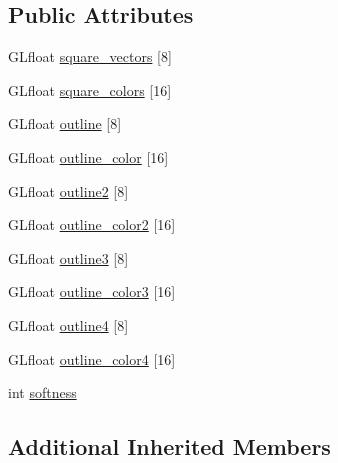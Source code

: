 \subsection*{Public Attributes}
\begin{DoxyCompactItemize}
\item 
G\-Lfloat \hyperlink{class_d_k_square_a4eca9a4d2f45774d95279f6aef199ae7}{square\-\_\-vectors} \mbox{[}8\mbox{]}
\item 
G\-Lfloat \hyperlink{class_d_k_square_aca963d87d432e09f8ecfabe70eb6771a}{square\-\_\-colors} \mbox{[}16\mbox{]}
\item 
G\-Lfloat \hyperlink{class_d_k_square_aeaf6eedc694eccfafcb03b7b7f78e1f8}{outline} \mbox{[}8\mbox{]}
\item 
G\-Lfloat \hyperlink{class_d_k_square_a2373e3e0b3c4eb9634c7ad9fb9e3260a}{outline\-\_\-color} \mbox{[}16\mbox{]}
\item 
G\-Lfloat \hyperlink{class_d_k_square_aad90d230189b0c82304faa9426e3ebef}{outline2} \mbox{[}8\mbox{]}
\item 
G\-Lfloat \hyperlink{class_d_k_square_a02176bdfd30fdf789d2a23f64564c443}{outline\-\_\-color2} \mbox{[}16\mbox{]}
\item 
G\-Lfloat \hyperlink{class_d_k_square_a6f7cd7d93e8ca07e5ace21aea4fd8926}{outline3} \mbox{[}8\mbox{]}
\item 
G\-Lfloat \hyperlink{class_d_k_square_a05c17fc69cf2c915907a92a0961f2d2c}{outline\-\_\-color3} \mbox{[}16\mbox{]}
\item 
G\-Lfloat \hyperlink{class_d_k_square_ab43a5926d331ff1caebf997d9d840c1c}{outline4} \mbox{[}8\mbox{]}
\item 
G\-Lfloat \hyperlink{class_d_k_square_ab89f9f0463af6078f74951e62c7e53e3}{outline\-\_\-color4} \mbox{[}16\mbox{]}
\item 
int \hyperlink{class_d_k_square_a111cbcd00a09e7b1501a47e6e6bd2cc7}{softness}
\end{DoxyCompactItemize}
\subsection*{Additional Inherited Members}


